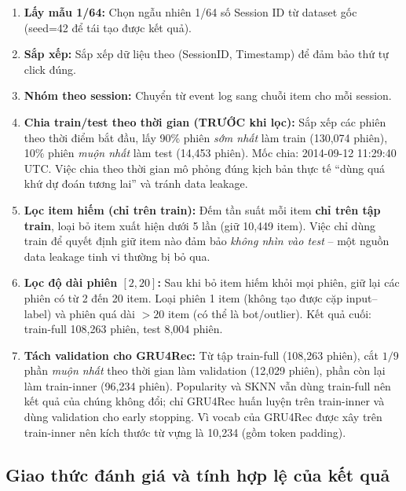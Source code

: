 \documentclass[12pt, a4paper]{article}
\begin{document}
\begin{enumerate}
    \item \textbf{Lấy mẫu 1/64:} Chọn ngẫu nhiên 1/64 số Session ID từ dataset gốc (seed=42 để tái tạo được kết quả).

    \item \textbf{Sắp xếp:} Sắp xếp dữ liệu theo (SessionID, Timestamp) để đảm bảo thứ tự click đúng.

    \item \textbf{Nhóm theo session:} Chuyển từ event log sang chuỗi item cho mỗi session.

    \item \textbf{Chia train/test theo thời gian (TRƯỚC khi lọc):} Sắp xếp các phiên theo thời điểm bắt đầu, lấy 90\% phiên \emph{sớm nhất} làm train (130,074 phiên), 10\% phiên \emph{muộn nhất} làm test (14,453 phiên). Mốc chia: 2014-09-12 11:29:40 UTC. Việc chia theo thời gian mô phỏng đúng kịch bản thực tế ``dùng quá khứ dự đoán tương lai'' và tránh data leakage.

    \item \textbf{Lọc item hiếm (chỉ trên train):} Đếm tần suất mỗi item \textbf{chỉ trên tập train}, loại bỏ item xuất hiện dưới 5 lần (giữ 10,449 item). Việc chỉ dùng train để quyết định giữ item nào đảm bảo \emph{không nhìn vào test} -- một nguồn data leakage tinh vi thường bị bỏ qua.

    \item \textbf{Lọc độ dài phiên $[2, 20]$:} Sau khi bỏ item hiếm khỏi mọi phiên, giữ lại các phiên có từ 2 đến 20 item. Loại phiên 1 item (không tạo được cặp input--label) và phiên quá dài $>20$ item (có thể là bot/outlier). Kết quả cuối: train-full 108,263 phiên, test 8,004 phiên.

    \item \textbf{Tách validation cho GRU4Rec:} Từ tập train-full (108,263 phiên), cắt $1/9$ phần \emph{muộn nhất} theo thời gian làm validation (12,029 phiên), phần còn lại làm train-inner (96,234 phiên). Popularity và SKNN vẫn dùng train-full nên kết quả của chúng không đổi; chỉ GRU4Rec huấn luyện trên train-inner và dùng validation cho early stopping. Vì vocab của GRU4Rec được xây trên train-inner nên kích thước từ vựng là 10,234 (gồm token padding).
\end{enumerate}

\subsection{Giao thức đánh giá và tính hợp lệ của kết quả}
\label{sec:protocol}
\end{document}
